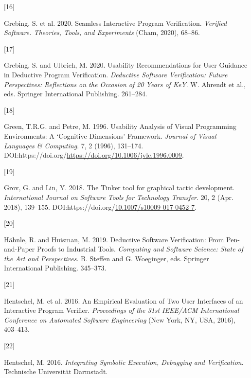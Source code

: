 \documentclass[
]{article}
\newlength{\cslhangindent}
\newlength{\csllabelwidth}
\newlength{\cslentryspacingunit} %
\newenvironment{CSLReferences}[2] %
 {%
  \setlength{\parindent}{0pt}
  \ifodd #1
  \let\oldpar\par
  \def\par{\hangindent=\cslhangindent\oldpar}
  \fi
  \setlength{\parskip}{#2\cslentryspacingunit}
 }%
 {}
\newcommand{\CSLLeftMargin}[1]{\parbox[t]{\csllabelwidth}{#1}}
\newcommand{\CSLRightInline}[1]{\parbox[t]{\linewidth - \csllabelwidth}{#1}\break}
\begin{document}
\begin{CSLReferences}{0}{0}
\leavevmode{}%
\CSLLeftMargin{{[}16{]} }
\CSLRightInline{Grebing, S. et al. 2020. Seamless {Interactive}
{Program} {Verification}. \emph{Verified {Software}. {Theories},
{Tools}, and {Experiments}} (Cham, 2020), 68--86.}

\leavevmode{}%
\CSLLeftMargin{{[}17{]} }
\CSLRightInline{Grebing, S. and Ulbrich, M. 2020. Usability
{Recommendations} for {User} {Guidance} in {Deductive} {Program}
{Verification}. \emph{Deductive {Software} {Verification}: {Future}
{Perspectives}: {Reflections} on the {Occasion} of 20 {Years} of {KeY}}.
W. Ahrendt et al., eds. Springer International Publishing. 261--284.}

\leavevmode{}%
\CSLLeftMargin{{[}18{]} }
\CSLRightInline{Green, T.R.G. and Petre, M. 1996. Usability {Analysis}
of {Visual} {Programming} {Environments}: {A} {`{Cognitive}
{Dimensions}'} {Framework}. \emph{Journal of Visual Languages \&
Computing}. 7, 2 (1996), 131--174.
DOI:https://doi.org/\url{https://doi.org/10.1006/jvlc.1996.0009}.}

\leavevmode{}%
\CSLLeftMargin{{[}19{]} }
\CSLRightInline{Grov, G. and Lin, Y. 2018. The {Tinker} tool for
graphical tactic development. \emph{International Journal on Software
Tools for Technology Transfer}. 20, 2 (Apr. 2018), 139--155.
DOI:https://doi.org/\href{https://doi.org/10.1007/s10009-017-0452-7}{10.1007/s10009-017-0452-7}.}

\leavevmode{}%
\CSLLeftMargin{{[}20{]} }
\CSLRightInline{Hähnle, R. and Huisman, M. 2019. Deductive {Software}
{Verification}: {From} {Pen}-and-{Paper} {Proofs} to {Industrial}
{Tools}. \emph{Computing and {Software} {Science}: {State} of the {Art}
and {Perspectives}}. B. Steffen and G. Woeginger, eds. Springer
International Publishing. 345--373.}

\leavevmode{}%
\CSLLeftMargin{{[}21{]} }
\CSLRightInline{Hentschel, M. et al. 2016. An {Empirical} {Evaluation}
of {Two} {User} {Interfaces} of an {Interactive} {Program} {Verifier}.
\emph{Proceedings of the 31st {IEEE}/{ACM} {International} {Conference}
on {Automated} {Software} {Engineering}} (New York, NY, USA, 2016),
403--413.}

\leavevmode{}%
\CSLLeftMargin{{[}22{]} }
\CSLRightInline{Hentschel, M. 2016. \emph{Integrating {Symbolic}
{Execution}, {Debugging} and {Verification}}. Technische Universität
Darmstadt.}


\end{CSLReferences}
\end{document}
